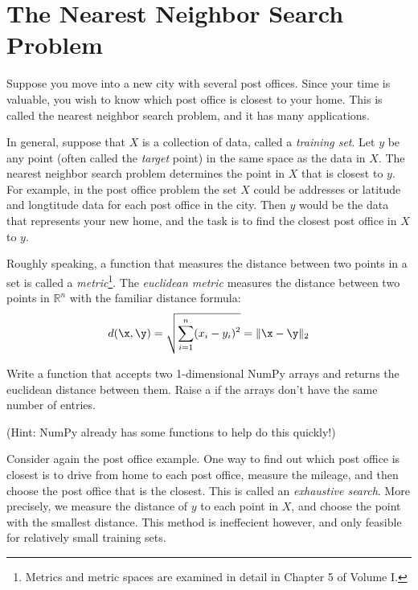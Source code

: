 \label{lab:NNS}


\section*{The Nearest Neighbor Search Problem}

Suppose you move into a new city with several post offices.
Since your time is valuable, you wish to know which post office is closest to your home.
This is called the nearest neighbor search problem, and it has many applications.

In general, suppose that $X$ is a collection of data, called a \emph{training set}.
Let $y$ be any point (often called the \emph{target} point) in the same space as the data in $X$.
The nearest neighbor search problem determines the point in $X$ that is closest to $y$.
For example, in the post office problem the set $X$ could be addresses or latitude and longtitude data for each post office in the city.
Then $y$ would be the data that represents your new home, and the task is to find the closest post office in $X$ to $y$.

\begin{problem}
Roughly speaking, a function that measures the distance between two points in a set is called a \emph{metric}\footnote{Metrics and metric spaces are examined in detail in Chapter 5 of Volume I.}.
The \emph{euclidean metric} measures the distance between two points in $\mathbb{R}^n$ with the familiar distance formula:
\[
d(\x,\y) = \sqrt{\displaystyle\sum_{i=1}^n (x_i - y_i)^2} = \| \x - \y \|_2
\]

Write a function that accepts two 1-dimensional NumPy arrays and returns the euclidean distance between them.
Raise a  if the arrays don't have the same number of entries.

(Hint: NumPy already has some functions to help do this quickly!)
\end{problem}

Consider again the post office example.
One way to find out which post office is closest is to drive from home to each post office, measure the mileage, and then choose the post office that is the closest.
This is called an \emph{exhaustive search}.
More precisely, we measure the distance of $y$ to each point in $X$, and choose the point with the smallest distance.
This method is ineffecient however, and only feasible for relatively small training sets.

